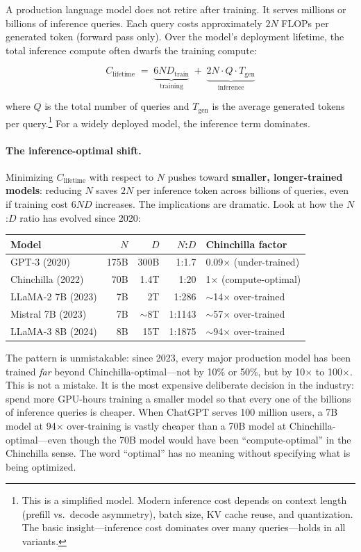A production language model does not retire after training. It serves millions or billions of inference queries. Each query costs approximately $2N$ FLOPs per generated token (forward pass only). Over the model's deployment lifetime, the total inference compute often dwarfs the training compute:

\[
C_{\text{lifetime}} \;=\; \underbrace{6ND_{\text{train}}}_{\text{training}} \;+\; \underbrace{2N \cdot Q \cdot T_{\text{gen}}}_{\text{inference}}
\]

where $Q$ is the total number of queries and $T_{\text{gen}}$ is the average generated tokens per query.\footnote{This is a simplified model. Modern inference cost depends on context length (prefill vs.\ decode asymmetry), batch size, KV cache reuse, and quantization. The basic insight---inference cost dominates over many queries---holds in all variants.} For a widely deployed model, the inference term dominates.

\paragraph{The inference-optimal shift.} Minimizing $C_{\text{lifetime}}$ with respect to $N$ pushes toward \textbf{smaller, longer-trained models}: reducing $N$ saves $2N$ per inference token across billions of queries, even if training cost $6ND$ increases. The implications are dramatic. Look at how the $N$:$D$ ratio has evolved since 2020:

\begin{center}
\begin{tabularx}{\textwidth}{@{}lrrrl@{}}
\toprule
\textbf{Model} & \textbf{$N$} & \textbf{$D$} & \textbf{$N$:$D$} & \textbf{Chinchilla factor} \\
\midrule
GPT-3 (2020) & 175B & 300B & 1:1.7 & 0.09$\times$ (under-trained) \\
Chinchilla (2022) & 70B & 1.4T & 1:20 & 1$\times$ (compute-optimal) \\
LLaMA-2 7B (2023) & 7B & 2T & 1:286 & $\sim$14$\times$ over-trained \\
Mistral 7B (2023) & 7B & $\sim$8T & 1:1143 & $\sim$57$\times$ over-trained \\
LLaMA-3 8B (2024) & 8B & 15T & 1:1875 & $\sim$94$\times$ over-trained \\
\bottomrule
\end{tabularx}
\end{center}

The pattern is unmistakable: since 2023, every major production model has been trained \emph{far} beyond Chinchilla-optimal---not by 10\% or 50\%, but by 10$\times$ to 100$\times$. This is not a mistake. It is the most expensive deliberate decision in the industry: spend more GPU-hours training a smaller model so that every one of the billions of inference queries is cheaper. When ChatGPT serves 100 million users, a 7B model at 94$\times$ over-training is vastly cheaper than a 70B model at Chinchilla-optimal---even though the 70B model would have been ``compute-optimal'' in the Chinchilla sense. The word ``optimal'' has no meaning without specifying what is being optimized.

